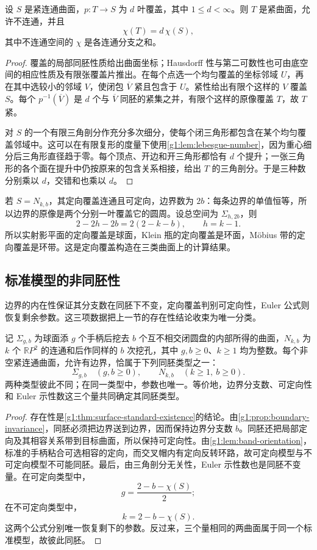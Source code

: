 \begin{proposition}\label{g1:prop:surface-finite-cover-euler}
	设 \(S\) 是紧连通曲面，\(p:T\rightarrow S\) 为 \(d\) 叶覆盖，其中 \(1\le d<\infty\)。则 \(T\) 是紧曲面，允许不连通，并且
	\[
		\chi(T)=d\,\chi(S),
	\]
	其中不连通空间的 \(\chi\) 是各连通分支之和。
\end{proposition}
\begin{proof}
	覆盖的局部同胚性质给出曲面坐标；Hausdorff 性与第二可数性也可由底空间的相应性质及有限张覆盖片推出。在每个点选一个均匀覆盖的坐标邻域 \(U\)，再在其中选较小的邻域 \(V\)，使闭包 \(\overline V\) 紧且包含于 \(U\)。紧性给出有限个这样的 \(V\) 覆盖 \(S\)。每个 \(p^{-1}(\overline V)\) 是 \(d\) 个与 \(\overline V\) 同胚的紧集之并，有限个这样的原像覆盖 \(T\)，故 \(T\) 紧。

	对 \(S\) 的一个有限三角剖分作充分多次细分，使每个闭三角形都包含在某个均匀覆盖邻域中。这可以在有限复形的度量下使用\cref{g1:lem:lebesgue-number}，因为重心细分后三角形直径趋于零。每个顶点、开边和开三角形都恰有 \(d\) 个提升；一张三角形的各个面在提升中仍按原来的包含关系相接，给出 \(T\) 的三角剖分。于是三种数分别乘以 \(d\)，交错和也乘以 \(d\)。
\end{proof}

若 \(S=N_{k,b}\)，其定向覆盖连通且可定向，边界数为 \(2b\)：每条边界的单值恒等，所以边界的原像是两个分别一叶覆盖它的圆周。设总空间为 \(\Sigma_{h,2b}\)，则
\[
	2-2h-2b=2(2-k-b),\qquad h=k-1.
\]
所以实射影平面的定向覆盖是球面，Klein 瓶的定向覆盖是环面，Möbius 带的定向覆盖是环带。这是定向覆盖构造在三类曲面上的计算结果。

\subsection{标准模型的非同胚性}
\label{g1:subsec:0605:03}

边界的内在性保证其分支数在同胚下不变，定向覆盖判别可定向性，Euler 公式则恢复剩余参数。这三项数据把上一节的存在性结论收束为唯一分类。

\begin{theorem}\label{g1:thm:surface-classification-unique}
	记 \(\Sigma_{g,b}\) 为球面添 \(g\) 个手柄后挖去 \(b\) 个互不相交闭圆盘的内部所得的曲面，\(N_{k,b}\) 为 \(k\) 个 \(\mathbb RP^2\) 的连通和后作同样的 \(b\) 次挖孔，其中 \(g,b\ge0\)、\(k\ge1\) 均为整数。每个非空紧连通曲面，允许有边界，恰属于下列同胚类型之一：
	\[
		\Sigma_{g,b}\quad(g,b\ge0),\qquad
		N_{k,b}\quad(k\ge1,\ b\ge0).
	\]
	两种类型彼此不同；在同一类型中，参数也唯一。等价地，边界分支数、可定向性和 Euler 示性数这三个量共同确定其同胚类型。
\end{theorem}
\begin{proof}
	存在性是\cref{g1:thm:surface-standard-existence}的结论。由\cref{g1:prop:boundary-invariance}，同胚必须把边界送到边界，因而保持边界分支数 \(b\)。同胚还把局部定向及其相容关系带到目标曲面，所以保持可定向性。由\cref{g1:lem:band-orientation}，标准的手柄粘合可选相容的定向，而交叉帽内有定向反转环路，故可定向模型与不可定向模型不可能同胚。最后，由三角剖分无关性，Euler 示性数也是同胚不变量。在可定向类型中，
	\[
		g=\frac{2-b-\chi(S)}2;
	\]
	在不可定向类型中，
	\[
		k=2-b-\chi(S).
	\]
	这两个公式分别唯一恢复剩下的参数。反过来，三个量相同的两曲面属于同一个标准模型，故彼此同胚。
\end{proof}

